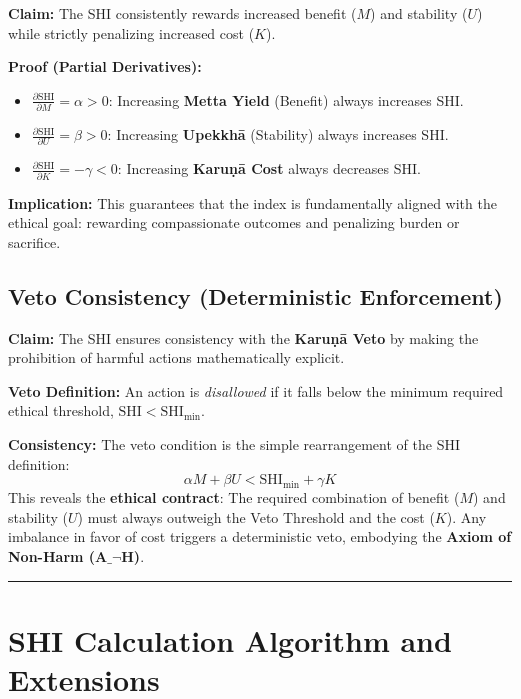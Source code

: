 \documentclass[12pt, a4paper]{article}
\begin{document}
\textbf{Claim:} The SHI consistently rewards increased benefit ($M$) and stability ($U$) while strictly penalizing increased cost ($K$).

\textbf{Proof (Partial Derivatives):}
\begin{itemize}
    \item $\frac{\partial \text{SHI}}{\partial M} = \alpha > 0$: Increasing \textbf{Metta Yield} (Benefit) always increases SHI.
    \item $\frac{\partial \text{SHI}}{\partial U} = \beta > 0$: Increasing \textbf{Upekkhā} (Stability) always increases SHI.
    \item $\frac{\partial \text{SHI}}{\partial K} = -\gamma < 0$: Increasing \textbf{Karuṇā Cost} always decreases SHI.
\end{itemize}
\textbf{Implication:} This guarantees that the index is fundamentally aligned with the ethical goal: rewarding compassionate outcomes and penalizing burden or sacrifice.

\subsection{Veto Consistency (Deterministic Enforcement)}

\textbf{Claim:} The SHI ensures consistency with the \textbf{Karuṇā Veto} by making the prohibition of harmful actions mathematically explicit.

\textbf{Veto Definition:} An action is \textit{disallowed} if it falls below the minimum required ethical threshold, $\text{SHI} < \text{SHI}_{\min}$.

\textbf{Consistency:} The veto condition is the simple rearrangement of the SHI definition:
$$
\alpha M + \beta U < \text{SHI}_{\min} + \gamma K
$$
This reveals the \textbf{ethical contract}: The required combination of benefit ($M$) and stability ($U$) must always outweigh the Veto Threshold and the cost ($K$). Any imbalance in favor of cost triggers a deterministic veto, embodying the \textbf{Axiom of Non-Harm ($\mathbf{A\_¬H}$)}.

\hrule

\section{SHI Calculation Algorithm and Extensions}
\end{document}
